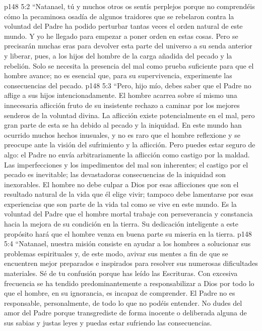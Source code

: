 \vs p148 5:2 \pc “Natanael, tú y muchos otros os sentís perplejos porque no comprendéis cómo la pecaminosa osadía de algunos traidores que se rebelaron contra la voluntad del Padre ha podido perturbar tantas veces el orden natural de este mundo. Y yo he llegado para empezar a poner orden en estas cosas. Pero se precisarán muchas eras para devolver esta parte del universo a su senda anterior y liberar, pues, a los hijos del hombre de la carga añadida del pecado y la rebelión. Solo se necesita la presencia del mal como prueba suficiente para que el hombre avance; no es esencial que, para su supervivencia, experimente las consecuencias del pecado.
\vs p148 5:3 “Pero, hijo mío, debes saber que el Padre no aflige a sus hijos intencionadamente. El hombre acarrea sobre sí mismo una innecesaria aflicción fruto de su insistente rechazo a caminar por los mejores senderos de la voluntad divina. La aflicción existe potencialmente en el mal, pero gran parte de esta se ha debido al pecado y la iniquidad. En este mundo han ocurrido muchos hechos inusuales, y no es raro que el hombre reflexione y se preocupe ante la visión del sufrimiento y la aflicción. Pero puedes estar seguro de algo: el Padre no envía arbitrariamente la aflicción como castigo por la maldad. Las imperfecciones y los impedimentos del mal son inherentes; el castigo por el pecado es inevitable; las devastadoras consecuencias de la iniquidad son inexorables. El hombre no debe culpar a Dios por esas aflicciones que son el resultado natural de la vida que él elige vivir; tampoco debe lamentarse por esas experiencias que son parte de la vida tal como se vive en este mundo. Es la voluntad del Padre que el hombre mortal trabaje con perseverancia y constancia hacia la mejora de su condición en la tierra. Su dedicación inteligente a este propósito hará que el hombre venza en buena parte su miseria en la tierra.
\vs p148 5:4 “Natanael, nuestra misión consiste en ayudar a los hombres a solucionar sus problemas espirituales y, de este modo, avivar sus mentes a fin de que se encuentren mejor preparados e inspirados para resolver sus numerosas dificultades materiales. Sé de tu confusión porque has leído las Escrituras. Con excesiva frecuencia se ha tendido predominantemente a responsabilizar a Dios por todo lo que el hombre, en su ignorancia, es incapaz de comprender. El Padre no es responsable, personalmente, de todo lo que no podéis entender. No dudes del amor del Padre porque transgrediste de forma inocente o deliberada alguna de sus sabias y justas leyes y puedas estar sufriendo las consecuencias.
